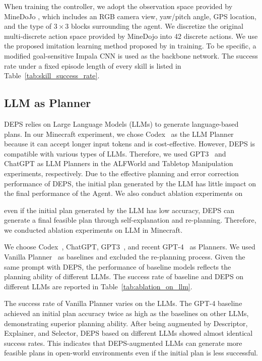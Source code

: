 \documentclass{article}
\begin{document}
When training the controller, we adopt the observation space provided by MineDoJo \cite{minedojo}, which includes an RGB camera view, yaw/pitch angle, GPS location, and the type of $3 \times 3$ blocks surrounding the agent. We discretize the original multi-discrete action space provided by MineDojo into 42 discrete actions. 
We use the proposed imitation learning method proposed by \cite{shaofei} in training. To be specific, a modified goal-sensitive Impala CNN is used as the backbone network. 
The success rate under a fixed episode length of every skill is listed in Table~\ref{tab:skill_success_rate}.

\subsection{LLM as Planner}

DEPS relies on Large Language Models (LLMs) to generate language-based plans. In our Minecraft experiment, we chose Codex~\cite{codex} as the LLM Planner because it can accept longer input tokens and is cost-effective. However, DEPS is compatible with various types of LLMs. Therefore, we used GPT3~\cite{gpt3} and ChatGPT as LLM Planners in the ALFWorld and Tabletop Manipulation experiments, respectively. Due to the effective planning and error correction performance of DEPS, the initial plan generated by the LLM has little impact on the final performance of the Agent. We also conduct ablation experiments on 


even if the initial plan generated by the LLM has low accuracy, DEPS can generate a final feasible plan through self-explanation and re-planning. Therefore, we conducted ablation experiments on LLM in Minecraft.

We choose Codex~\cite{codex}, ChatGPT, GPT3~\cite{gpt3}, and recent GPT-4~\cite{gpt4} as Planners. We used Vanilla Planner~\cite{huang2022language} as baselines and excluded the re-planning process. Given the same prompt with DEPS, the performance of baseline models reflects the planning ability of different LLMs. The success rate of baseline and DEPS on different LLMs are reported in Table~\ref{tab:ablation_on_llm}. 



The success rate of Vanilla Planner varies on the LLMs. The GPT-4 baseline achieved an initial plan accuracy twice as high as the baselines on other LLMs, demonstrating superior planning ability. After being augmented by Descriptor, Explainer, and Selector, DEPS based on different LLMs showed almost identical success rates. This indicates that DEPS-augmented LLMs can generate more feasible plans in open-world environments even if the initial plan is less successful.
\end{document}
